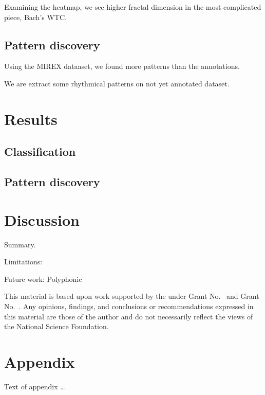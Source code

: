 \documentclass[acmsmall,review,anonymous]{acmart}\settopmatter{printfolios=true,printccs=false,printacmref=false}
\begin{document}
Examining the heatmap, we see higher fractal dimension in the most complicated
piece, Bach's WTC. 

\subsection{Pattern discovery}
Using the MIREX dataaset, we found more patterns than the annotations.

We are extract some rhythmical patterns on not yet annotated dataset.

\section{Results}

\subsection{Classification}
\subsection{Pattern discovery}


\section{Discussion}

Summary. 

Limitations: 

Future work: Polyphonic


\begin{acks}                            %
  This material is based upon work supported by the
   under Grant
  No.~ and Grant
  No.~.  Any opinions, findings, and
  conclusions or recommendations expressed in this material are those
  of the author and do not necessarily reflect the views of the
  National Science Foundation.
\end{acks}


%


\appendix
\section{Appendix}

Text of appendix \ldots
\end{document}
